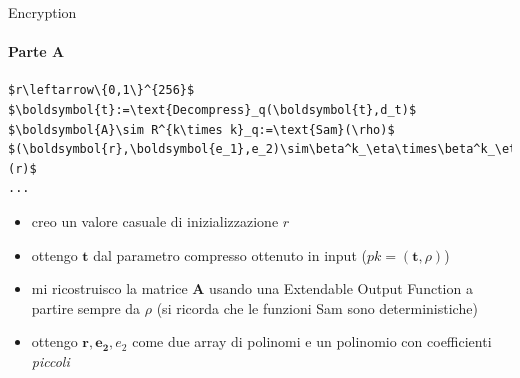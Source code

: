 \begin{frame}[fragile]{Encryption}
    \framesubtitle{Parte A}
    \begin{minipage}{0.45\linewidth}
        \begin{lstlisting}[title={Kyber.CPA.Enc(pk,m):},mathescape=true]
$r\leftarrow\{0,1\}^{256}$
$\boldsymbol{t}:=\text{Decompress}_q(\boldsymbol{t},d_t)$
$\boldsymbol{A}\sim R^{k\times k}_q:=\text{Sam}(\rho)$
$(\boldsymbol{r},\boldsymbol{e_1},e_2)\sim\beta^k_\eta\times\beta^k_\eta\times\beta_\eta:=\text{Sam}(r)$
...
        \end{lstlisting}
    \end{minipage}\hfill
    \begin{minipage}{0.5\linewidth}
        \begin{itemize}%
            \item creo un valore casuale di inizializzazione $r$
            \item ottengo $\boldsymbol{t}$ dal parametro compresso ottenuto in input ($pk=(\boldsymbol{t},\rho)$)
            \item mi ricostruisco la matrice $\boldsymbol{A}$ usando una Extendable Output Function a partire sempre da $\rho$ (si ricorda che le funzioni Sam sono deterministiche)
            \item ottengo $\boldsymbol{r},\boldsymbol{e_2},e_2$ come due array di polinomi e un polinomio con coefficienti \textit{piccoli}

        \end{itemize}
    \end{minipage}
\end{frame}

